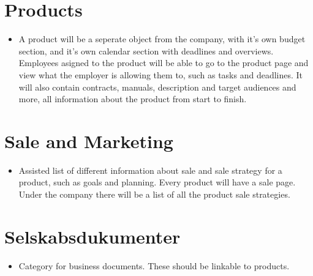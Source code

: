 \section{Products}
\begin{itemize}
  \item A product will be a seperate object from the company, with it's own budget section, and it's own calendar section with deadlines and overviews. Employees asigned to the product will be able to go to the product page and view what the employer is allowing them to, such as tasks and deadlines. It will also contain contracts, manuals, description and target audiences and more, all information about the product from start to finish.
\end{itemize}

\section{Sale and Marketing}
\begin{itemize}
  \item Assisted list of different information about sale and sale strategy for a product, such as goals and planning. Every product will have a sale page. Under the company there will be a list of all the product sale strategies.
\end{itemize}

\section{Selskabsdukumenter}
\begin{itemize}
  \item Category for business documents. These should be linkable to products.
\end{itemize}